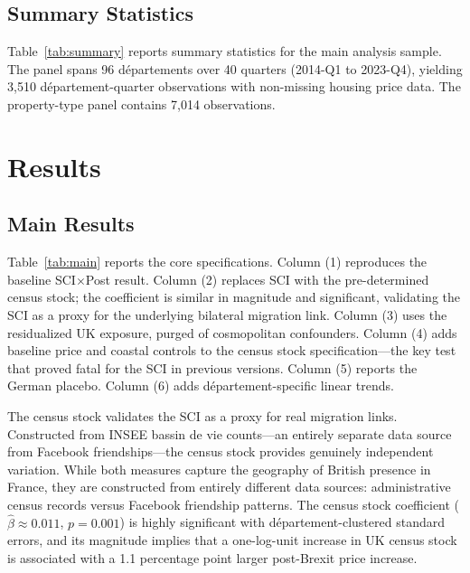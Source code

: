 \documentclass[12pt]{article}
\begin{document}
\subsection{Summary Statistics}

Table~\ref{tab:summary} reports summary statistics for the main analysis sample. The panel spans 96 d\'epartements over 40 quarters (2014-Q1 to 2023-Q4), yielding 3,510 d\'epartement-quarter observations with non-missing housing price data. The property-type panel contains 7,014 observations.




\section{Results}\label{sec:results}

\subsection{Main Results}

Table~\ref{tab:main} reports the core specifications. Column (1) reproduces the baseline SCI$\times$Post result. Column (2) replaces SCI with the pre-determined census stock; the coefficient is similar in magnitude and significant, validating the SCI as a proxy for the underlying bilateral migration link. Column (3) uses the residualized UK exposure, purged of cosmopolitan confounders. Column (4) adds baseline price and coastal controls to the census stock specification---the key test that proved fatal for the SCI in previous versions. Column (5) reports the German placebo. Column (6) adds d\'epartement-specific linear trends.

{\footnotesize}

The census stock validates the SCI as a proxy for real migration links. Constructed from INSEE bassin de vie counts---an entirely separate data source from Facebook friendships---the census stock provides genuinely independent variation. While both measures capture the geography of British presence in France, they are constructed from entirely different data sources: administrative census records versus Facebook friendship patterns. The census stock coefficient ($\hat{\beta} \approx 0.011$, $p = 0.001$) is highly significant with d\'epartement-clustered standard errors, and its magnitude implies that a one-log-unit increase in UK census stock is associated with a 1.1 percentage point larger post-Brexit price increase.
\end{document}

